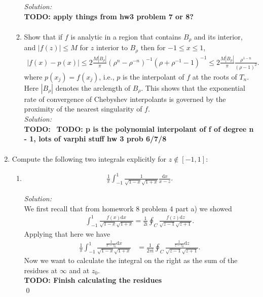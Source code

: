 \documentclass[10pt]{amsart}
\newcommand{\D}{\mathrm{d}}
\newcommand{\I}{\mathrm{i}}
\theoremstyle{nonumberplain}
\begin{document}
\begin{enumerate}[label={\bf {\arabic*}:}]
\begin{enumerate}
\noindent
\textit{Solution:} \\
\textbf{TODO: apply things from hw3 problem 7 or 8?}
\begin{align*}
\end{align*}

\item Show that if $f$ is analytic in a region that contains $B_\rho$ and its interior, and $|f(z)| \leq M$ for $z$ interior to $B_\rho$ then for $-1 \leq x \leq 1$,
\begin{align*}
|f(x) - p(x)| \leq 2 \frac{M | B_\rho| }{\pi}  (\rho^n - \rho^{-n})^{-1} (\rho + \rho^{-1} - 1)^{-1} \leq 2 \frac{M | B_\rho| }{\pi} \frac{\rho^{1-n}}{(\rho - 1)^2}.
\end{align*}
where $p(x_j) = f(x_j)$, i.e., $p$ is the interpolant of $f$ at the roots of $T_n$. 
Here $|B_\rho|$ denotes the arclength of $B_\rho$.  This shows that the exponential rate of convergence of Chebyshev interpolants is governed by the proximity of the nearest singularity of $f$. \\

\noindent
\textit{Solution:} \\
\textbf{TODO:} \
\textbf{TODO: p is the polynomial interpolant of f of degree n - 1, lots of varphi stuff hw 3 prob 6/7/8}
\begin{align*}
\end{align*}
      
\end{enumerate}
\newpage


\item Compute the following two integrals explicitly for $ z \not \in [-1,1]$:
\begin{enumerate}
\item
\begin{align*}
\frac{1}{\pi}\int_{-1}^1 \frac{1}{\sqrt{1-x} \sqrt{1 + x}} \frac{\D x}{x -z}.
\end{align*}

\textit{Solution:} \\
We first recall that from homework 8 problem 4 part a) we showed
\begin{align}
\int_{-1}^1 \frac {f(x)\D x} {\sqrt {1 - x} \sqrt {1 + x}} = \frac 1 {2 \I} \oint_C \frac {f(z)\D z} {\sqrt {z - 1} \sqrt {z + 1}}.
\label{eq:eq3}
\end{align}
Applying that here we have
\begin{align*}
\frac 1 \pi \int_{-1}^1 \frac {\frac 1 {x - z_0}\D x} {\sqrt {1 - x} \sqrt {1 + x}}
	&= \frac 1 {2 \pi \I} \oint_C \frac {\frac 1 {z - z_0}\D z} {\sqrt {z - 1} \sqrt {z + 1}}.
\end{align*}
Now we want to calculate the integral on the right as the sum of the residues at $\infty$ and at $z_0$. \\
\textbf{TODO: Finish calculating the residues} \\
\qed \\


\end{enumerate}
\end{enumerate}
\end{document}
